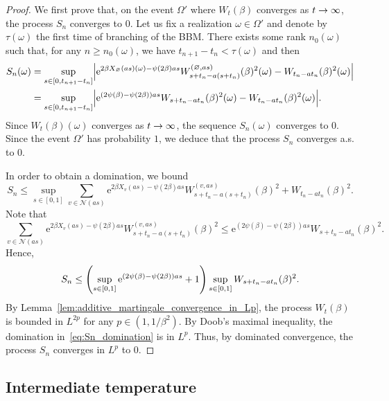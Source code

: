 \documentclass[AHL,Unicode,longabstracts,published]{cedram}
\newcommand{\e}{\mathrm{e}}
\newcommand\1{\mathds{1}}
\newcommand{\cN}{\mathcal{N}}
\let\originalleft\left
\let\originalright\right
\renewcommand{\left}{\mathopen{}\mathclose\bgroup\originalleft}
\renewcommand{\right}{\aftergroup\egroup\originalright}
\renewcommand*{\to}{\mathchoice{\longrightarrow}{\rightarrow}{\rightarrow}{\rightarrow}}
\begin{document}
\begin{proof}
We first prove that, on the event $\Omega'$ where $W_t(\beta)$ converges as $t \to \infty$, the process $S_n$ converges to $0$. Let us fix a realization $\omega \in \Omega'$ and denote by $\tau(\omega)$ the first time of branching of the BBM. There exists some rank $n_0(\omega)$ such that, for any $n \geq n_0(\omega)$, we have $t_{n+1} - t_n < \tau(\omega)$ and then
\begin{align*}
S_n(\omega) &= \sup_{s \in [0, t_{n+1} - t_n]} \left|\e^{2\beta X_\varnothing(as)(\omega) - \psi(2\beta)as} W_{s + t_n - a(s + t_n)}^{(\varnothing, as)}(\beta)^2(\omega) - W_{t_n - at_n}(\beta)^2(\omega)\right|\\
&= \sup_{s \in [0, t_{n+1} - t_n]} \left|\e^{(2\psi(\beta) - \psi(2\beta))as} W_{s + t_n - at_n}(\beta)^2(\omega) - W_{t_n - at_n}(\beta)^2(\omega)\right|. 
\end{align*}
Since $W_t(\beta)(\omega)$ converges as $t \to \infty$, the sequence $S_n(\omega)$ converges to $0$. Since the event $\Omega'$ has probability $1$, we deduce that the process $S_n$ converges a.s. to $0$.

In order to obtain a domination, we bound
\begin{equation*}
S_n \leq \sup_{s \in [0, 1]} \sum_{v \in \cN(as)} \e^{2\beta X_v(as) - \psi(2\beta)as} W_{s + t_n - a(s + t_n)}^{(v, as)}(\beta)^2 + W_{t_n - at_n}(\beta)^2.
\end{equation*}
Note that
\begin{equation*}
\sum_{v \in \cN(as)} \e^{2\beta X_v(as) - \psi(2\beta)as} W_{s + t_n - a(s + t_n)}^{(v, as)}(\beta)^2 \leq \e^{(2\psi(\beta) - \psi(2\beta))as} W_{s + t_n - at_n}(\beta)^2.
\end{equation*}
Hence,
\begin{equation}\label{eq:Sn_domination}
S_n \leq \left(\sup_{s \in [0, 1]} \e^{(2\psi(\beta) - \psi(2\beta))as} + 1\right) \sup_{s \in [0, 1]} W_{s + t_n - at_n}(\beta)^2.
\end{equation}
By Lemma~\ref{lem:additive_martingale_convergence_in_Lp}, the process $W_t(\beta)$ is bounded in $L^{2p}$ for any $p \in (1, 1/\beta^2)$. By Doob's maximal inequality, the domination in~\eqref{eq:Sn_domination} is in $L^p$. Thus, by dominated convergence, the process $S_n$ converges in $L^p$ to $0$.
\end{proof}

\subsection{Intermediate temperature}
\end{document}
